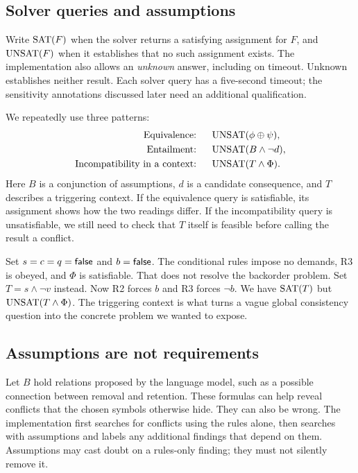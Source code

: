 
\subsection{Solver queries and assumptions}

Write $\operatorname{SAT}(F)$ when the solver returns a satisfying assignment for $F$, and $\operatorname{UNSAT}(F)$ when it establishes that no such assignment exists. The implementation also allows an \emph{unknown} answer, including on timeout. Unknown establishes neither result. Each solver query has a five-second timeout; the sensitivity annotations discussed later need an additional qualification.

We repeatedly use three patterns:
\begin{align}
\text{Equivalence: }&\quad \operatorname{UNSAT}(\phi\oplus\psi),\label{eq:equivalence}\\
\text{Entailment: }&\quad \operatorname{UNSAT}(B\land\neg d),\label{eq:entailment}\\
\text{Incompatibility in a context: }&\quad \operatorname{UNSAT}(T\land\Phi).\label{eq:incompatibility}
\end{align}
Here $B$ is a conjunction of assumptions, $d$ is a candidate consequence, and $T$ describes a triggering context. If the equivalence query is satisfiable, its assignment shows how the two readings differ. If the incompatibility query is unsatisfiable, we still need to check that $T$ itself is feasible before calling the result a conflict.

Set $s=c=q=\mathsf{false}$ and $b=\mathsf{false}$. The conditional rules impose no demands, R3 is obeyed, and $\Phi$ is satisfiable. That does not resolve the backorder problem. Set $T=s\land\neg v$ instead. Now R2 forces $b$ and R3 forces $\neg b$. We have $\operatorname{SAT}(T)$ but $\operatorname{UNSAT}(T\land\Phi)$. The triggering context is what turns a vague global consistency question into the concrete problem we wanted to expose.

\subsection{Assumptions are not requirements}

Let $B$ hold relations proposed by the language model, such as a possible connection between removal and retention. These formulas can help reveal conflicts that the chosen symbols otherwise hide. They can also be wrong. The implementation first searches for conflicts using the rules alone, then searches with assumptions and labels any additional findings that depend on them. Assumptions may cast doubt on a rules-only finding; they must not silently remove it.

